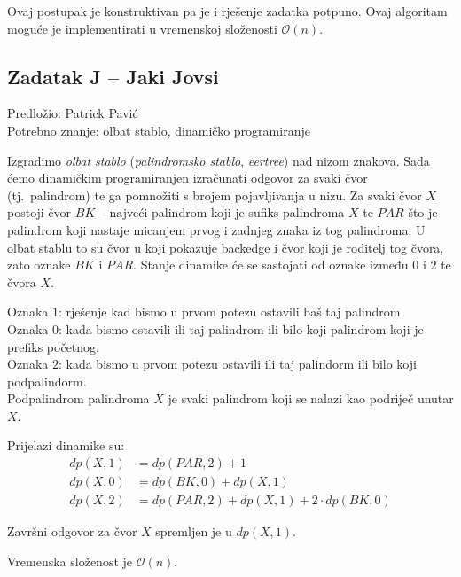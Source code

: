\documentclass[a4paper]{article}
\begin{document}
Ovaj postupak je konstruktivan pa je i rješenje zadatka potpuno. Ovaj algoritam
moguće je implementirati u vremenskoj složenosti $\mathcal{O}(n)$.

\subsection*{Zadatak J -- Jaki Jovsi}
\textsf{Predložio: Patrick Pavić}\\
\textsf{Potrebno znanje: olbat stablo, dinamičko programiranje}

Izgradimo \textit{olbat stablo} (\textit{palindromsko stablo}, \textit{eertree})
nad nizom znakova. Sada ćemo dinamičkim programiranjen izračunati odgovor za
svaki čvor (tj.\ palindrom) te ga pomnožiti s brojem pojavljivanja u nizu.
Za svaki čvor $X$ postoji čvor $BK$ -- najveći palindrom koji je sufiks
palindroma $X$ te $PAR$ što je palindrom koji nastaje micanjem prvog i zadnjeg
znaka iz tog palindroma. U olbat stablu to su čvor u koji pokazuje backedge i
čvor koji je roditelj tog čvora, zato oznake $BK$ i $PAR$. Stanje dinamike će 
se sastojati od oznake između $0$ i $2$ te čvora $X$.

Oznaka $1$: rješenje kad bismo u prvom potezu ostavili baš taj palindrom\\
Oznaka $0$: kada bismo ostavili ili taj palindrom ili bilo koji palindrom koji je prefiks početnog.\\
Oznaka $2$: kada bismo u prvom potezu ostavili ili taj palindorm ili bilo koji podpalindorm.\\

Podpalindrom palindroma $X$ je svaki palindrom koji se nalazi kao podriječ unutar $X$.

Prijelazi dinamike su:
\begin{align*}
  dp(X, 1) &= dp(PAR, 2) + 1 \\
  dp(X, 0) &= dp(BK, 0) + dp(X, 1) \\
  dp(X, 2) &= dp(PAR, 2) + dp(X, 1) + 2 \cdot dp(BK, 0)
\end{align*}

Završni odgovor za čvor $X$ spremljen je u $dp(X,1)$.

Vremenska složenost je $\mathcal{O}(n)$.
\end{document}

